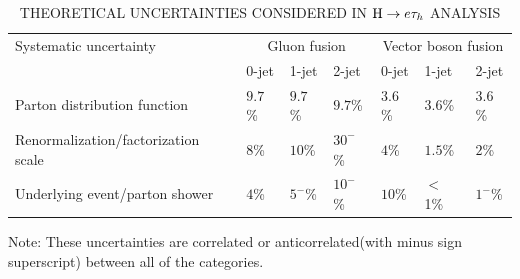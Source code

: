 \begin{table}[hbtp]
 \caption{THEORETICAL UNCERTAINTIES CONSIDERED IN $\mathrm{H} \to e \tau_{h}$ ANALYSIS}  \label{tab:theory_systematics}
 \centering
 \begin{threeparttable}
  \begin{tabular}{l|l|l|l|l|l|l} \hline
Systematic uncertainty                  &  \multicolumn{3}{c|}{Gluon fusion} &  \multicolumn{3}{c}{Vector boson fusion}  \\ \cline{2-7}
                                &    0-jet  & 1-jet  & 2-jet   & 0-jet & 1-jet  & 2-jet  \\ \hline
Parton distribution function         &    $9.7$\%  &  $9.7$\% &   $9.7$\% & $3.6$\%  &   $3.6$\%  &  $3.6$\%  \\
Renormalization/factorization scale           &    $8$\%    &  $10$\%   &  $30^{-}$\%   & $4$\%     &   $1.5$\%  & $2$\%   \\
Underlying event/parton shower  &   $4$\%     & $5^{-}$\%   &  $10^{-}$\%   & $10$\%    &   $<$1\%    & $1^{-}$\%   \\ \hline
  \end{tabular}
  \begin{tablenotes}
  \small
  \item Note: These uncertainties are correlated or anticorrelated(with minus sign superscript) between all of the categories.
  \end{tablenotes}
  \end{threeparttable}
\end{table}


       




